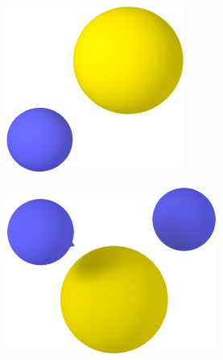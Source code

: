 \begin{figure}[htpb]%
    \centering%
    \setlength{\myfigwidth}{0.17\textwidth}
    \begin{subfigure}[c]{0.8\myfigwidth}%
        \includegraphics[width=\textwidth]{images/passivation/tetrahedra01_01.png}%
        \caption{}%
        \label{fig:pass_tet01}%
    \end{subfigure}%
    \hspace{1cm}%
    \begin{subfigure}[c]{\myfigwidth}%
        \includegraphics[width=\textwidth]{images/passivation/tetrahedra02_01.png}%

\end{subfigure}
\end{figure}
